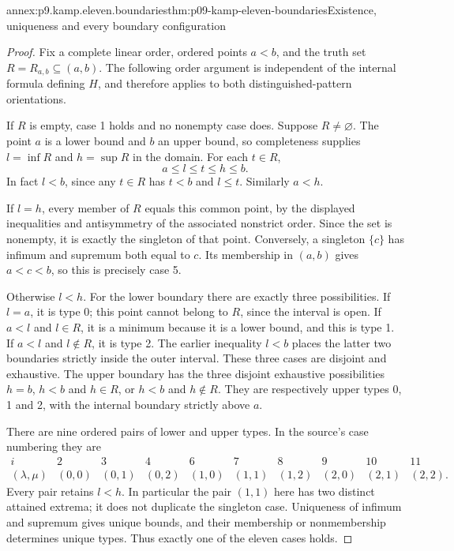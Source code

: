 \begin{annexitem}{annex:p9.kamp.eleven.boundaries}{thm:p09-kamp-eleven-boundaries}{Existence, uniqueness and every boundary configuration}
\begin{proof}
Fix a complete linear order, ordered points \(a<b\), and the
truth set \(R=R_{a,b}\subseteq(a,b)\). The following order
argument is independent of the internal formula defining \(H\),
and therefore applies to both distinguished-pattern orientations.

If \(R\) is empty, case 1 holds and no nonempty case does.
Suppose \(R\ne\varnothing\). The point \(a\) is a lower
bound and \(b\) an upper bound, so completeness supplies
\(l=\inf R\) and \(h=\sup R\) in the domain.
For each \(t\in R\),
\[
                          a\leq l\leq t\leq h\leq b.
\]
In fact \(l<b\), since any \(t\in R\) has \(t<b\)
and \(l\leq t\). Similarly \(a<h\).

If \(l=h\), every member of \(R\) equals this common point,
by the displayed inequalities and antisymmetry of the associated
nonstrict order. Since the set is nonempty, it is exactly the
singleton of that point. Conversely, a singleton \(\{c\}\)
has infimum and supremum both equal to \(c\). Its membership
in \((a,b)\) gives \(a<c<b\), so this is precisely case 5.

Otherwise \(l<h\). For the lower boundary there are exactly
three possibilities. If \(l=a\), it is type 0; this point
cannot belong to \(R\), since the interval is open.
If \(a<l\) and \(l\in R\), it is a minimum because
it is a lower bound, and this is type 1. If \(a<l\) and
\(l\notin R\), it is type 2. The earlier inequality \(l<b\)
places the latter two boundaries strictly inside the outer interval.
These three cases are disjoint and exhaustive. The upper boundary
has the three disjoint exhaustive possibilities \(h=b\),
\(h<b\) and \(h\in R\), or \(h<b\) and \(h\notin R\).
They are respectively upper types 0, 1 and 2, with the internal
boundary strictly above \(a\).

There are nine ordered pairs of lower and upper types. In the source's
case numbering they are
\[
\begin{array}{c|ccccccccc}
 i&2&3&4&6&7&8&9&10&11\\ \hline
 (\lambda,\mu)&(0,0)&(0,1)&(0,2)&(1,0)&(1,1)&(1,2)&(2,0)&(2,1)&(2,2).
\end{array}
\]
Every pair retains \(l<h\). In particular the pair \((1,1)\)
here has two distinct attained extrema; it does not duplicate the
singleton case. Uniqueness of infimum and supremum gives unique
bounds, and their membership or nonmembership determines unique
types. Thus exactly one of the eleven cases holds.


\end{proof}
\end{annexitem}
